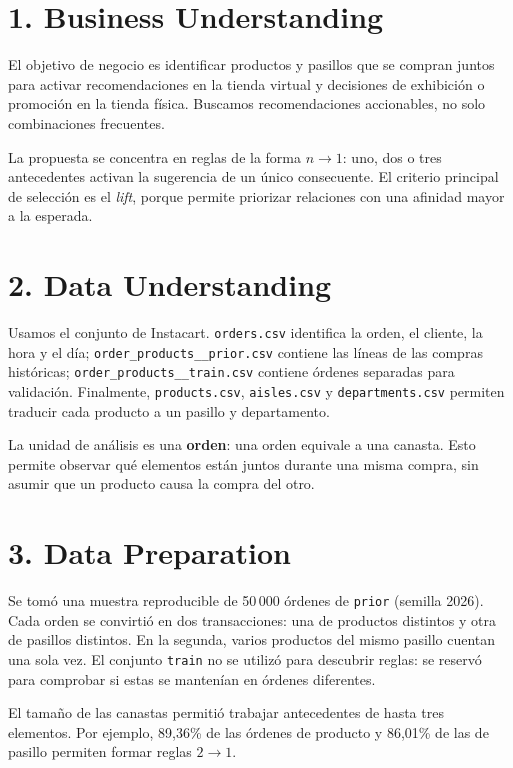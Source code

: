 \documentclass[10pt,letterpaper]{article}
\newcommand{\pct}[1]{#1\%}
\begin{document}
\section*{1. Business Understanding}

El objetivo de negocio es identificar productos y pasillos que se compran juntos para activar recomendaciones en la tienda virtual y decisiones de exhibición o promoción en la tienda física. Buscamos recomendaciones accionables, no solo combinaciones frecuentes.

La propuesta se concentra en reglas de la forma $n\rightarrow1$: uno, dos o tres antecedentes activan la sugerencia de un único consecuente. El criterio principal de selección es el \textit{lift}, porque permite priorizar relaciones con una afinidad mayor a la esperada.

\section*{2. Data Understanding}

Usamos el conjunto de Instacart. \texttt{orders.csv} identifica la orden, el cliente, la hora y el día; \texttt{order\_products\_\_prior.csv} contiene las líneas de las compras históricas; \texttt{order\_products\_\_train.csv} contiene órdenes separadas para validación. Finalmente, \texttt{products.csv}, \texttt{aisles.csv} y \texttt{departments.csv} permiten traducir cada producto a un pasillo y departamento.

La unidad de análisis es una \textbf{orden}: una orden equivale a una canasta. Esto permite observar qué elementos están juntos durante una misma compra, sin asumir que un producto causa la compra del otro.

\section*{3. Data Preparation}

Se tomó una muestra reproducible de 50\,000 órdenes de \texttt{prior} (semilla 2026). Cada orden se convirtió en dos transacciones: una de productos distintos y otra de pasillos distintos. En la segunda, varios productos del mismo pasillo cuentan una sola vez. El conjunto \texttt{train} no se utilizó para descubrir reglas: se reservó para comprobar si estas se mantenían en órdenes diferentes.

El tamaño de las canastas permitió trabajar antecedentes de hasta tres elementos. Por ejemplo, \pct{89,36} de las órdenes de producto y \pct{86,01} de las de pasillo permiten formar reglas $2\rightarrow1$.
\end{document}
